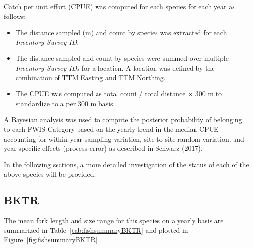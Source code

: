 \documentclass[]{article}\usepackage[]{graphicx}\usepackage[]{color}
\begin{document}
Catch per unit effort (CPUE) was computed for each species for each year as follows:
\begin{itemize}
\item The distance sampled (m) and count by species was extracted for each {\it Inventory Survey ID}.
\item The distance sampled and count by species were summed over multiple {\it Inventory Survey IDs} for a location.
A location was defined by the combination of TTM Easting and TTM Northing. 
\item The CPUE was computed as total count / total distance $\times$ 300 m to standardize to a per 300 m basis.
\end{itemize}
A Bayesian analysis was used to 
compute the posterior probability of belonging to each FWIS Category based on the yearly trend in the median CPUE
accounting for within-year sampling variation, site-to-site random variation, and year-specific effects (process error)
as described in Schwarz (2017).



In the following sections, a more detailed investigation of the status of each of the above species will be provided.







\clearpage %
\subsection{ BKTR}



The  mean fork length and size range for this species on a yearly basis are summarized in 
Table~\ref{tab:fishsummaryBKTR} 
and plotted in 
Figure~\ref{fig:fishsummaryBKTR}.
\end{document}

